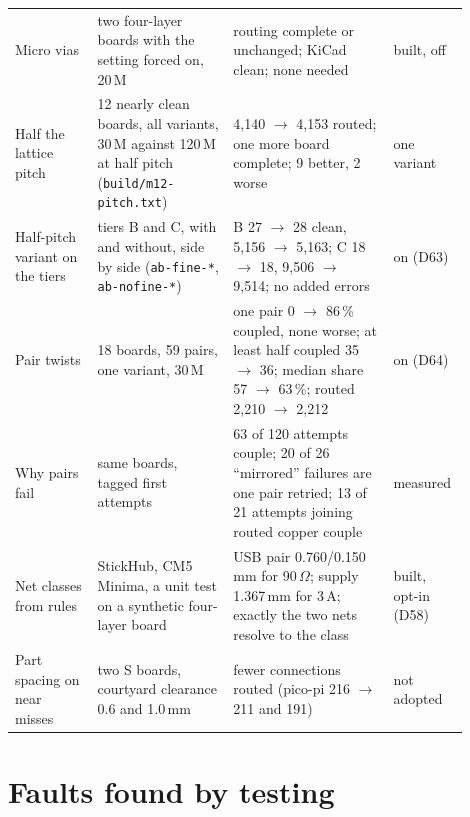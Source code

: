 \documentclass[10pt,a4paper]{article}
\newcommand{\code}[1]{\texttt{#1}}
\begin{document}
{\begin{longtable}{@{}p{0.17\linewidth}p{0.29\linewidth}p{0.33\linewidth}p{0.11\linewidth}@{}}
Micro vias & two four-layer boards with the setting forced on, 20\,M & routing complete or unchanged; KiCad clean; none needed & built, off \\
Half the lattice pitch & 12 nearly clean boards, all variants, 30\,M against 120\,M at half pitch (\code{build/m12-pitch.txt}) & 4,140 $\to$ 4,153 routed; one more board complete; 9 better, 2 worse & one variant \\
Half-pitch variant on the tiers & tiers B and C, with and without, side by side (\code{ab-fine-*}, \code{ab-nofine-*}) & B 27 $\to$ 28 clean, 5,156 $\to$ 5,163; C 18 $\to$ 18, 9,506 $\to$ 9,514; no added errors & on (D63) \\
Pair twists & 18 boards, 59 pairs, one variant, 30\,M & one pair 0 $\to$ 86\,\% coupled, none worse; at least half coupled 35 $\to$ 36; median share 57 $\to$ 63\,\%; routed 2,210 $\to$ 2,212 & on (D64) \\
Why pairs fail & same boards, tagged first attempts & 63 of 120 attempts couple; 20 of 26 ``mirrored'' failures are one pair retried; 13 of 21 attempts joining routed copper couple & measured \\
Net classes from rules & StickHub, CM5 Minima, a unit test on a synthetic four-layer board & USB pair 0.760/0.150\,mm for 90\,$\Omega$; supply 1.367\,mm for 3\,A; exactly the two nets resolve to the class & built, opt-in (D58) \\
Part spacing on near misses & two S boards, courtyard clearance 0.6 and 1.0\,mm & fewer connections routed (pico-pi 216 $\to$ 211 and 191) & not adopted \\
\bottomrule
\end{longtable}
}

\section{Faults found by testing}\label{sec:faults}
\end{document}
